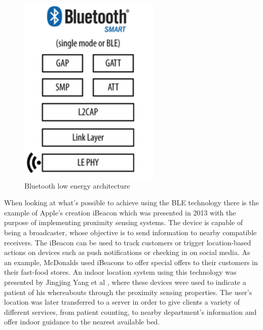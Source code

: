 \documentclass[a4paper]{IEEEtran}
\begin{document}
 
 
 
 
 
 \begin{figure}[htp] 
\centering 
\includegraphics[width=0.5\linewidth]{figures/BLEArchitecture.png} 
\caption[Bluetooth Low Energy Architecture]{Bluetooth low energy architecture} 
\label{fig:BLEarchitecture} 
\end{figure} 
 
 
 
 
When looking at what's possible to achieve using the BLE technology there is the example of Apple's creation iBeacon \cite{ibeacon} which was presented in 2013 with the purpose of implementing proximity sensing systems. The device is capable of being a broadcaster, whose objective is to send information to nearby compatible receivers. The iBeacon can be used to track customers or trigger location-based actions on devices such as push notifications or checking in on social media. As an example, McDonalds used iBeacons to offer special offers to their customers in their fast-food stores. An indoor location system using this technology was presented by Jingjing Yang et al \cite{ibeacon1}, where these devices were used to indicate a patient of his whereabouts through the proximity sensing properties. The user's location was later transferred to a server in order to give clients a variety of different services, from patient counting, to nearby department's information and offer indoor guidance to the nearest available bed.  
 
\end{document}
